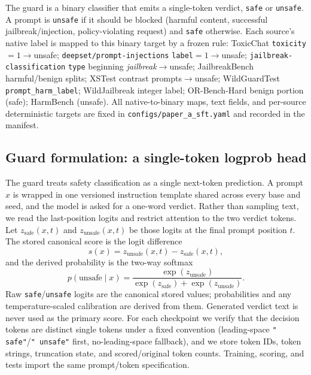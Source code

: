 \documentclass[sigconf,nonacm]{acmart}
\begin{document}
The guard is a binary classifier that emits a single-token verdict, \texttt{safe} or \texttt{unsafe}. A prompt is \texttt{unsafe} if it should be blocked (harmful content, successful jailbreak/injection, policy-violating request) and \texttt{safe} otherwise. Each source's native label is mapped to this binary target by a frozen rule: ToxicChat \texttt{toxicity}$=1\!\to\!$unsafe; \texttt{deepset/prompt-injections} \texttt{label}$=1\!\to\!$unsafe; \texttt{jailbreak-classification} \texttt{type} beginning \emph{jailbreak}$\to\!$unsafe; JailbreakBench harmful/benign splits; XSTest contrast prompts$\to\!$unsafe; WildGuardTest \texttt{prompt\_harm\_label}; WildJailbreak integer label; OR-Bench-Hard benign portion (safe); HarmBench (unsafe). All native-to-binary maps, text fields, and per-source deterministic targets are fixed in \texttt{configs/paper\_a\_sft.yaml} and recorded in the manifest.

\subsection{Guard formulation: a single-token logprob head}
\label{subsec:guard}

The guard treats safety classification as a single next-token prediction. A prompt $x$ is wrapped in one versioned instruction template shared across every base and seed, and the model is asked for a one-word verdict. Rather than sampling text, we read the last-position logits and restrict attention to the two verdict tokens. Let $z_{\text{safe}}(x,t)$ and $z_{\text{unsafe}}(x,t)$ be those logits at the final prompt position $t$. The stored canonical score is the logit difference
\begin{equation}
\label{eq:score}
s(x) = z_{\text{unsafe}}(x,t) - z_{\text{safe}}(x,t),
\end{equation}
and the derived probability is the two-way softmax
\begin{equation}
\label{eq:prob}
p(\text{unsafe}\mid x) = \frac{\exp(z_{\text{unsafe}})}{\exp(z_{\text{safe}}) + \exp(z_{\text{unsafe}})}.
\end{equation}
Raw \texttt{safe}/\texttt{unsafe} logits are the canonical stored values; probabilities and any temperature-scaled calibration are derived from them. Generated verdict text is never used as the primary score. For each checkpoint we verify that the decision tokens are distinct single tokens under a fixed convention (leading-space \texttt{" safe"}/\texttt{" unsafe"} first, no-leading-space fallback), and we store token IDs, token strings, truncation state, and scored/original token counts. Training, scoring, and tests import the same prompt/token specification.
\end{document}
